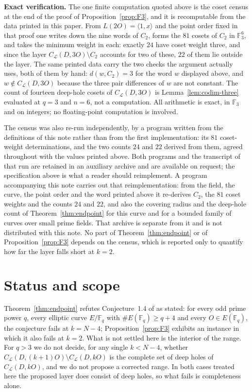 \documentclass[11pt]{amsart}
\newcommand{\F}{\mathbb{F}}
\newcommand{\CL}{C_{\mathcal L}}
\begin{document}
\medskip
\noindent\textbf{Exact verification.}
The one finite computation quoted above is the coset census at the end of the
proof of Proposition~\ref{prop:F3}, and it is recomputable from the data
printed in this paper. From $L(2O)=\langle1,x\rangle$ and the point order fixed
in that proof one writes down the nine words of $C_2$, forms the $81$ cosets of
$C_2$ in $\F_3^6$, and takes the minimum weight in each: exactly $24$ have
coset weight three, and since the layer $\CL(D,3O)\setminus C_2$ accounts for
two of these, $22$ of them lie outside the layer. The same printed data carry
the two checks the argument actually uses, both of them by hand:
$d(w,C_2)=3$ for the word $w$ displayed above, and $w\notin\CL(D,3O)$ because
the three pair differences of $w$ are not constant. The count of fourteen
deep-hole cosets of $\CL(D,3O)$ is Lemma~\ref{lem:codim-three} evaluated at
$q=3$ and $n=6$, not a computation. All arithmetic is exact, in $\F_3$ and on
integers; no floating-point computation is involved.

The census was also re-run independently, by a program written from the
definitions of this note rather than from the first implementation: its $81$
coset-weight determinations, and the two counts $24$ and $22$ derived from
them, agreed throughout with the values printed above. Both programs and the
transcript of that run are retained in an auxiliary archive and are available
on request; the specification above is what a reader should reimplement. A
program accompanying this note carries out that reimplementation: from the
field, the curve, the point order and the word printed above it re-derives
$C_2$, the $81$ coset weights and the counts $24$ and $22$, and also the
covering radius and the deep-hole count of Theorem~\ref{thm:endpoint} for this
curve and for a bounded family of curves over small prime fields. That archive
is separate from it and is not distributed with this note. No
part of Theorem~\ref{thm:endpoint} or of Proposition~\ref{prop:F3} depends on
the census, which is reported only to quantify how far the layer falls short
at $k=2$.

\section*{Status and scope}

Theorem~\ref{thm:endpoint} refutes Conjecture~1.4 of \cite{ZhangWan} as
stated: for every odd prime power $q$, every elliptic curve $E/\F_q$ with
$\#E(\F_q)\ge q+4$ and every $O\in E(\F_q)$, the conjecture fails at
$k=N-4$; Proposition~\ref{prop:F3} exhibits an instance in which it also
fails at $k=2$. What is not settled here is the interior of the range.
For $q>3$ we do not decide, for any single $k<N-4$, whether
$\CL(D,(k+1)O)\setminus\CL(D,kO)$ is the complete set of deep holes of
$\CL(D,kO)$, and we do not propose a corrected range. In both cases
treated here the proposed layer does consist of deep holes, so what fails
is completeness alone.
\end{document}
